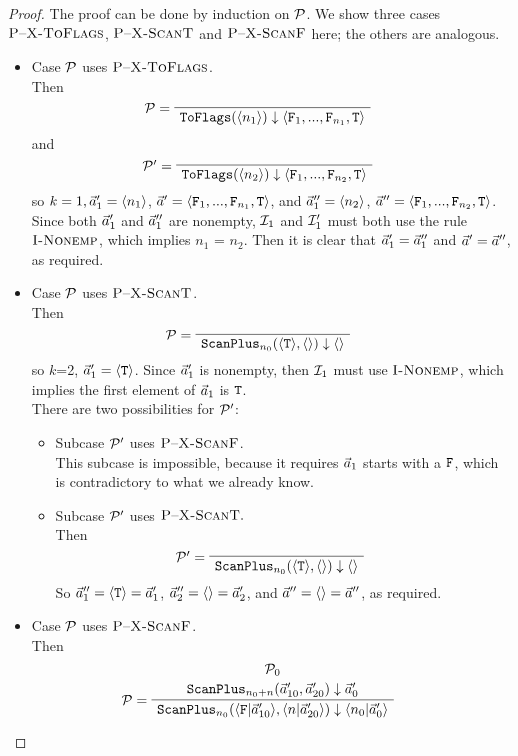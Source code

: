 \begin{proof}
	The proof can be done by induction on $\mathcal{P}$. We show three cases 
	$\textsc{P--X-ToFlags}$, $\textsc{P--X-ScanT}$ and $\textsc{P--X-ScanF}$ here; the others are analogous.
	\begin{itemize}
		\item Case $\mathcal{P}$ uses $\textsc{P--X-ToFlags}$. \\
		Then
		$$	\PT{\LeLa{\MP =} 
			\Axiom{\blockf{\toflag}{\singl{n_1}}{\< \F_1,...,\F_{n_1},\T \'>}} }
		$$
		and 
		$$	\PT{\LeLa{\MP' =} 
			\Axiom{\blockf{\toflag}{\singl{n_2}}{\< \F_1,...,\F_{n_2},\T \'>}} }
		$$
		so $k=1, \vec a_1' = \langle n_1 \rangle$, $\a' = \< \F_1,...,\F_{n_1},\T \'>$, and  
		$\vec a_1'' = \langle n_2 \rangle$, $\a'' = \< \F_1,...,\F_{n_2},\T \'>$. \\
		Since both $\vec a_1'$ and $\vec a_1''$ are nonempty, $\mathcal{I}_{1}$ and $\mathcal{I}_{1}'$ must both use the rule $\textsc{I-Nonemp}$,
		which implies $n_1$ = $n_2$. 
		Then it is clear that $\vec a_1' = \vec a_1''$ and $\vec a' = \vec a''$, as required. 
		
		\item Case $\mathcal{P}$ uses $\textsc{P--X-ScanT}$. \\
		Then 	
		$$\PT{\LeLa{\MP = } \Axiom{\blockf{\scan_{n_0}}{\oT, \emptyv}{\emptyv}}}$$
		so $k$=2, $\vec a_1' = \langle \mathtt{T} \rangle$. 
		Since $\vec a'_1$ is nonempty, then $\mathcal{I}_{1}$ must use $\textsc{I-Nonemp}$, which implies the first element of $\vec a_1$ is $\mathtt{T}$. \\		
		There are two possibilities for $\mathcal{P}'$:
		\begin{itemize}
			\item Subcase $\mathcal{P}'$ uses $\textsc{P--X-ScanF}$.\\
			This subcase is impossible, because it requires $\vec a_1$ starts with a $\mathtt{F}$, which is contradictory to what we already know.
			
			\item Subcase $\mathcal{P}'$ uses $\textsc{P--X-ScanT}.$ \\
			Then $$\PT{\LeLa{\MP' = } \Axiom{\blockf{\scan_{n_0}}{\oT, \emptyv}{\emptyv}}}$$
			So $\vec a''_1 = \langle \mathtt{T} \rangle = \vec a'_1$, $\vec a''_2 = \langle \rangle = \vec a'_2$, and $\vec a'' = \langle \rangle = \vec a''$, as required. 
			
		\end{itemize}
		
		
		\item Case $\mathcal{P}$ uses $\textsc{P--X-ScanF}$. \\
		Then 
		$$\PT{\UCN{\MP_0}{\blockf{\scan_{n_0+n}}{\a'_{10},\a'_{20}}{\a_0'}}
			\LeLa{\MP = }
			\UC{\blockf{\scan_{n_0}}{\<\F|\a'_{10} \'>, \<n|\a'_{20}\'>}{\<n_0|\a'_0\'>}}
		}$$
	

\end{itemize}
\end{proof}

